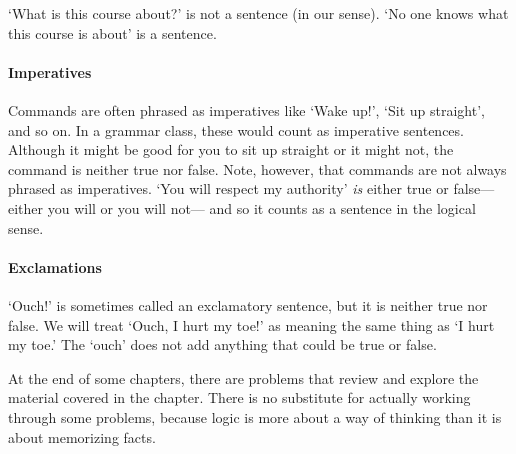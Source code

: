`What is this course about?' is not a sentence (in our sense). `No one knows what this course is about' is a sentence.

\paragraph{Imperatives} Commands are often phrased as imperatives like `Wake up!', `Sit up straight', and so on. In a grammar class, these would count as imperative sentences. Although it might be good for you to sit up straight or it might not, the command is neither true nor false. Note, however, that commands are not always phrased as imperatives. `You will respect my authority' \emph{is} either true or false--- either you will or you will not--- and so it counts as a sentence in the logical sense.

\paragraph{Exclamations} `Ouch!' is sometimes called an exclamatory sentence, but it is neither true nor false. We will treat `Ouch, I hurt my toe!' as meaning the same thing as `I hurt my toe.' The `ouch' does not add anything that could be true or false.


\practiceproblems
At the end of some chapters, there are problems that review and explore the material covered in the chapter. There is no substitute for actually working through some problems, because logic is more about a way of thinking than it is about memorizing facts.

\medskip

